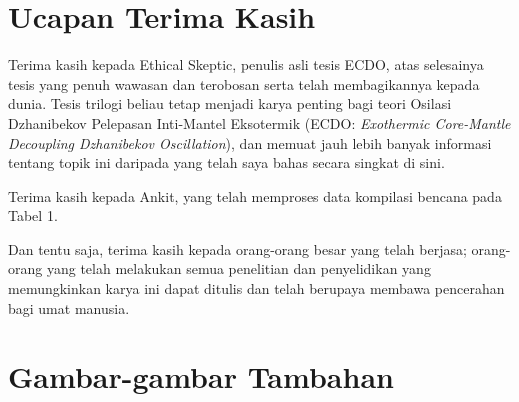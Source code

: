 \documentclass[10pt,twocolumn,letterpaper]{article}
\begin{document}
\section{Ucapan Terima Kasih}

Terima kasih kepada Ethical Skeptic, penulis asli tesis ECDO, atas selesainya tesis yang penuh wawasan dan terobosan serta telah membagikannya kepada dunia. Tesis trilogi beliau \cite{1} tetap menjadi karya penting bagi teori Osilasi Dzhanibekov Pelepasan Inti-Mantel Eksotermik (ECDO: \textit{Exothermic Core-Mantle Decoupling Dzhanibekov Oscillation}), dan memuat jauh lebih banyak informasi tentang topik ini daripada yang telah saya bahas secara singkat di sini.

Terima kasih kepada Ankit, yang telah memproses data kompilasi bencana pada Tabel 1.

Dan tentu saja, terima kasih kepada orang-orang besar yang telah berjasa; orang-orang yang telah melakukan semua penelitian dan penyelidikan yang memungkinkan karya ini dapat ditulis dan telah berupaya membawa pencerahan bagi umat manusia.

\clearpage
\twocolumn

\section{Gambar-gambar Tambahan}
\end{document}
